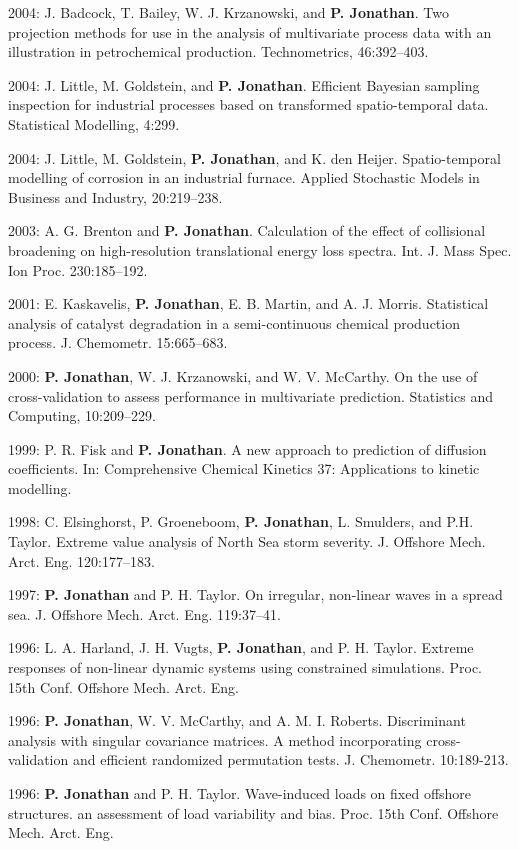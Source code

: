 \documentclass[11pt,a4paper]{moderncv}
\begin{document}
2004: J. Badcock, T. Bailey, W. J. Krzanowski, and \textbf{P. Jonathan}. Two projection methods for use in the analysis of multivariate process data with an illustration in petrochemical production. Technometrics, 46:392--403.

2004: J. Little, M. Goldstein, and \textbf{P. Jonathan}. Efficient Bayesian sampling inspection for industrial processes based on transformed spatio-temporal data. Statistical Modelling, 4:299.

2004: J. Little, M. Goldstein, \textbf{P. Jonathan}, and K. den Heijer. Spatio-temporal modelling of corrosion in an industrial furnace. Applied Stochastic Models in Business and Industry, 20:219--238.

2003: A. G. Brenton and \textbf{P. Jonathan}. Calculation of the effect of collisional broadening on high-resolution translational energy loss spectra. Int. J. Mass Spec. Ion Proc. 230:185--192.

2001: E. Kaskavelis, \textbf{P. Jonathan}, E. B. Martin, and A. J. Morris. Statistical analysis of catalyst degradation in a semi-continuous chemical production process. J. Chemometr. 15:665--683.

2000: \textbf{P. Jonathan}, W. J. Krzanowski, and W. V. McCarthy. On the use of cross-validation to assess performance in multivariate prediction. Statistics and Computing, 10:209--229.

1999: P. R. Fisk and \textbf{P. Jonathan}. A new approach to prediction of diffusion coefficients. In: Comprehensive Chemical Kinetics 37: Applications to kinetic modelling. 

1998: C. Elsinghorst, P. Groeneboom, \textbf{P. Jonathan}, L. Smulders, and P.H. Taylor. Extreme value analysis of North Sea storm severity. J. Offshore Mech. Arct. Eng. 120:177--183.

1997: \textbf{P. Jonathan} and P. H. Taylor. On irregular, non-linear waves in a spread sea. J. Offshore Mech. Arct. Eng. 119:37--41.

1996: L. A. Harland, J. H. Vugts, \textbf{P. Jonathan}, and P. H. Taylor. Extreme responses of non-linear dynamic systems using constrained simulations. Proc. 15th Conf. Offshore Mech. Arct. Eng.

1996: \textbf{P. Jonathan}, W. V. McCarthy, and A. M. I. Roberts. Discriminant analysis with singular covariance matrices. A method incorporating cross-validation and efficient randomized permutation tests. J. Chemometr. 10:189-213.

1996: \textbf{P. Jonathan} and P. H. Taylor. Wave-induced loads on fixed offshore structures. an assessment of load variability and bias. Proc. 15th Conf. Offshore Mech. Arct. Eng.
\end{document}
